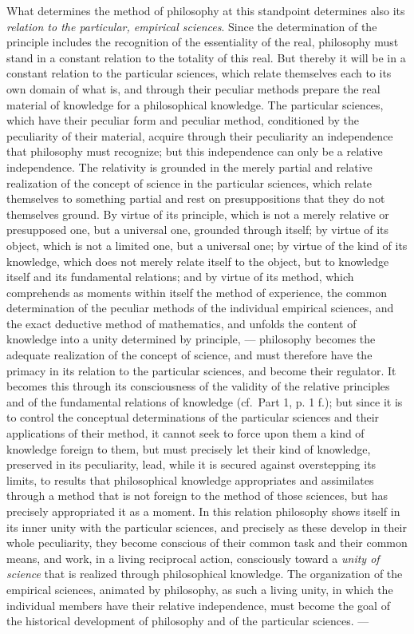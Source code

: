 What determines the method of philosophy at this standpoint determines
also its \emph{relation to the particular, empirical sciences}. Since
the determination of the principle includes the recognition of the
essentiality of the real, philosophy must stand in a constant relation
to the totality of this real. But thereby it will be in a constant
relation to the particular sciences, which relate themselves each to
its own domain of what is, and through their peculiar methods prepare
the real material of knowledge for a philosophical knowledge. The
particular sciences, which have their peculiar form and peculiar
method, conditioned by the peculiarity of their material, acquire
through their peculiarity an independence that philosophy must
recognize; but this independence can only be a relative independence.
The relativity is grounded in the merely partial and relative
realization of the concept of science in the particular sciences, which
relate themselves to something partial and rest on presuppositions that
they do not themselves ground. By virtue of its principle, which is not
a merely relative or presupposed one, but a universal one, grounded
through itself; by virtue of its object, which is not a limited one,
but a universal one; by virtue of the kind of its knowledge, which does
not merely relate itself to the object, but to knowledge
itself and its fundamental relations; and by virtue of its method,
which comprehends as moments within itself the method of experience,
the common determination of the peculiar methods of the individual
empirical sciences, and the exact deductive method of mathematics, and
unfolds the content of knowledge into a unity determined by principle,
--- philosophy becomes the adequate realization of the concept of
science, and must therefore have the primacy in its relation to the
particular sciences, and become their regulator. It becomes this
through its consciousness of the validity of the relative principles
and of the fundamental relations of knowledge (cf.\ Part 1, p. 1 f.);
but since it is to control the conceptual determinations of the
particular sciences and their applications of their method, it cannot
seek to force upon them a kind of knowledge foreign to them, but must
precisely let their kind of knowledge, preserved in its peculiarity,
lead, while it is secured against overstepping its limits, to results
that philosophical knowledge appropriates and assimilates through a
method that is not foreign to the method of those sciences, but has
precisely appropriated it as a moment. In this relation philosophy
shows itself in its inner unity with the particular sciences, and
precisely as these develop in their whole peculiarity, they become
conscious of their common task and their common means, and work, in a
living reciprocal action, consciously toward a \emph{unity of science}
that is realized through philosophical knowledge. The organization of
the empirical sciences, animated by philosophy, as such a living unity,
in which the individual members have their relative independence, must
become the goal of the historical development of philosophy and of the
particular sciences. ---

